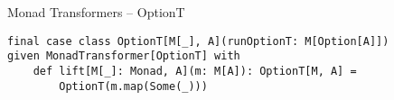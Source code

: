 \documentclass[presentation, 10pt]{beamer}\mode<presentation>{\usetheme{metropolis}}
\begin{document}
\begin{frame}[fragile]{Monad Transformers -- OptionT}
	\begin{center}
	\end{center}
\begin{tcolorbox}
\begin{verbatim}
final case class OptionT[M[_], A](runOptionT: M[Option[A]])
given MonadTransformer[OptionT] with 
	def lift[M[_]: Monad, A](m: M[A]): OptionT[M, A] = 
		OptionT(m.map(Some(_)))
\end{verbatim}
\end{tcolorbox}
\end{frame}
\end{document}
